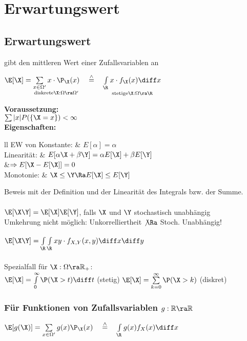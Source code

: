 \documentclass[german,color,6pt]{latex4ei/latex4ei_sheet}
\begin{document}
\columnbreak
\section{Erwartungswert}
\begin{sectionbox}
	\subsection{Erwartungswert}
	gibt den mittleren Wert einer Zufallsvariablen an

	\begin{emphbox}
		$\E [\X] = \underset{\text{diskrete} \X:\Omega \ra \Omega'}{\sum\limits_{x \in \Omega'} x \cdot \P_{\X}(x)} \quad \stackrel{\wedge}{=}\quad \underset{\text{stetige} \X: \Omega \ra \R}{\int \limits_{\R} x \cdot f_{\X} (x) \diff x}$
	\end{emphbox}
	\textbf{Voraussetzung:}\\
	$\sum |x| P(\{\X=x\})<\infty$\\
	\textbf{Eigenschaften:}
	\begin{tablebox}{ll}
		EW von Konstante: &
		$E[\alpha] = \alpha$\\
		Linearität: &
		$E[\alpha \X + \beta \Y] = \alpha E [\X] + \beta E[\Y]$ \\
		&$\Rightarrow E[\X-E[\X]] = 0$\\
		Monotonie: &
		$\X \le \Y \Ra E[\X] \le E[\Y]$ \\
	\end{tablebox}
	Beweis mit der Definition und der Linearität des Integrals bzw. der Summe. \\
	\\
	$\E[\X\Y] = \E[\X] \E[\Y]$, falls $\X$ und $\Y$ stochastisch unabhängig\\
	Umkehrung nicht möglich: Unkorrelliertheit $\not \Ra$ Stoch. Unabhängig! \\
	\\
	$\E[\X\Y]= \int \limits_{\R}\int \limits_{\R}  xy \cdot f_{X,Y} (x,y) \diff x \diff y$\\
	\\
	Spezialfall für $\X: \Omega \ra \mathbb R_+$: \\
	$\E[\X] = \int \limits_0^\infty \P(\X > t) \diff t$ (stetig) \qquad $\E[\X] = \sum \limits_{k=0}^{\infty} \P(\X >k)$ (diskret)

	\subsubsection{Für Funktionen von Zufallsvariablen $g: \mathbb R \ra \mathbb R$}
	$\E[g(\X)] = \sum \limits_{x \in \Omega'} g(x) \P_{\X} (x)\quad \stackrel{\wedge}{=}\quad \int \limits_{\R} g(x) f_X (x) \diff x$
\end{sectionbox}
\end{document}
